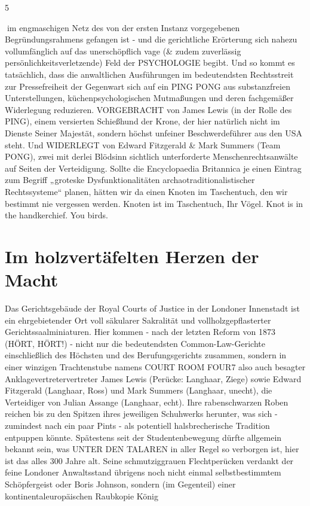 \begin{multicols}{2}
5

im engmaschigen Netz des von der ersten Instanz vorgegebenen Begründungsrahmens gefangen ist - und die
gerichtliche Erörterung sich nahezu vollumfänglich auf
das unerschöpflich vage (\& zudem zuverlässig persönlichkeitsverletzende) Feld der PSYCHOLOGIE begibt.
Und so kommt es tatsächlich, dass die anwaltlichen
Ausführungen im bedeutendsten Rechtsstreit zur Pressefreiheit der Gegenwart sich auf ein PING PONG aus
substanzfreien Unterstellungen, küchenpsychologischen Mutmaßungen und deren fachgemäßer Widerlegung reduzieren. VORGEBRACHT von James Lewis (in
der Rolle des PING), einem versierten Schießhund der
Krone, der hier natürlich nicht im Dienste Seiner Majestät, sondern höchst unfeiner Beschwerdeführer aus den
USA steht. Und WIDERLEGT von Edward Fitzgerald \&
Mark Summers (Team PONG), zwei mit derlei Blödsinn
sichtlich unterforderte Menschenrechtsanwälte auf Seiten der Verteidigung.
Sollte die Encyclopaedia Britannica je einen Eintrag zum
Begriff „groteske Dysfunktionalitäten archaotraditionalistischer Rechtssysteme“ planen, hätten wir da einen
Knoten im Taschentuch, den wir bestimmt nie vergessen
werden. Knoten ist im Taschentuch, Ihr Vögel. Knot is in
the handkerchief. You birds.


\chapter{Im holzvertäfelten Herzen der Macht} %

Das Gerichtsgebäude der Royal Courts of Justice in der
Londoner Innenstadt ist ein ehrgebietender Ort voll
säkularer Sakralität und vollholzgepflasterter Gerichtssaalminiaturen. Hier kommen - nach der letzten Reform
von 1873 (HÖRT, HÖRT!) - nicht nur die bedeutendsten
Common-Law-Gerichte einschließlich des Höchsten
und des Berufungsgerichts zusammen, sondern in einer
winzigen Trachtenstube namens COURT ROOM FOUR7
also auch besagter Anklagevertretervertreter James Lewis (Perücke: Langhaar, Ziege) sowie Edward Fitzgerald
(Langhaar, Ross) und Mark Summers (Langhaar, unecht),
die Verteidiger von Julian Assange (Langhaar, echt).
Ihre rabenschwarzen Roben reichen bis zu den Spitzen
ihres jeweiligen Schuhwerks herunter, was sich - zumindest nach ein paar Pints - als potentiell halsbrecherische Tradition entpuppen könnte. Spätestens seit der
Studentenbewegung dürfte allgemein bekannt sein, was
UNTER DEN TALAREN in aller Regel so verborgen ist,
hier ist das alles 300 Jahre alt. Seine schmutziggrauen
Flechtperücken verdankt der feine Londoner Anwaltsstand übrigens noch nicht einmal selbstbestimmtem
Schöpfergeist oder Boris Johnson, sondern (im Gegenteil) einer kontinentaleuropäischen Raubkopie König


\end{multicols}
